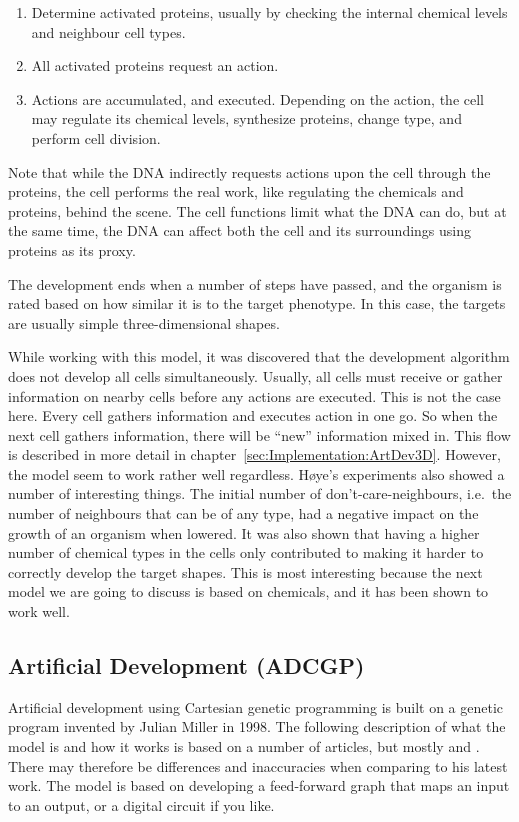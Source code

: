 \begin{enumerate}
	\itemsep=0pt
	\item Determine activated proteins, usually by checking the internal chemical levels and neighbour cell types.
	\item All activated proteins request an action.
	\item Actions are accumulated, and executed. Depending on the action, the cell may regulate its chemical levels, synthesize proteins, change type, and perform cell division.
\end{enumerate}

Note that while the DNA indirectly requests actions upon the cell through the proteins, the cell performs the real work, like regulating the chemicals and proteins, behind the scene. The cell functions limit what the DNA can do, but at the same time, the DNA can affect both the cell and its surroundings using proteins as its proxy.

The development ends when a number of steps have passed, and the organism is rated based on how similar it is to the target phenotype. In this case, the targets are usually simple three-dimensional shapes.

While working with this model, it was discovered that the development algorithm does not develop all cells simultaneously. Usually, all cells must receive or gather information on nearby cells before any actions are executed. This is not the case here. Every cell gathers information and executes action in one go. So when the next cell gathers information, there will be ``new'' information mixed in. This flow is described in more detail in chapter~\ref{sec:Implementation:ArtDev3D}. However, the model seem to work rather well regardless. H{\o}ye's experiments also showed a number of interesting things. The initial number of don't-care-neighbours, i.e.\ the number of neighbours that can be of any type, had a negative impact on the growth of an organism when lowered. It was also shown that having a higher number of chemical types in the cells only contributed to making it harder to correctly develop the target shapes. This is most interesting because the next model we are going to discuss is based on chemicals, and it has been shown to work well.


\subsection{Artificial Development (ADCGP)}
Artificial development using Cartesian genetic programming is built on a genetic program invented by Julian Miller in 1998. The following description of what the model is and how it works is based on a number of articles, but mostly \cite{mteurogp2000} and \cite{ecal2003}. There may therefore be differences and inaccuracies when comparing to his latest work. The model is based on developing a feed-forward graph that maps an input to an output, or a digital circuit if you like.

